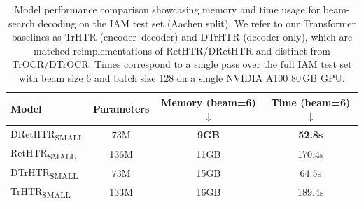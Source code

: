 \documentclass[times, review, 10pt]{elsarticle}
\begin{document}
\begin{table}[t]
\centering
\caption{Model performance comparison showcasing memory and time usage for beam-search decoding on the IAM test set (Aachen split). We refer to our Transformer baselines as TrHTR (encoder–decoder) and DTrHTR (decoder-only), which are matched reimplementations of RetHTR/DRetHTR and distinct from TrOCR/DTrOCR. Times correspond to a single pass over the full IAM test set with beam size 6 and batch size 128 on a single NVIDIA A100 80\,GB GPU. }
{\small
\begin{tabular*}{\linewidth}{@{\extracolsep{\fill}}lccc@{}}
\toprule
\textbf{Model} & \textbf{Parameters} & \textbf{Memory (beam=6)} $\downarrow$ & \textbf{Time (beam=6)} $\downarrow$ \\
\midrule
DRetHTR\textsubscript{SMALL} & \phantom{1}73M & \phantom{1}\textbf{9GB}  & \phantom{1}\textbf{52.8s} \\
RetHTR\textsubscript{SMALL}  & 136M           & 11GB                     & 170.4s \\
DTrHTR\textsubscript{SMALL}  & \phantom{1}73M & 15GB                     & \phantom{1}64.5s \\
TrHTR\textsubscript{SMALL}   & 133M           & 16GB                     & 189.4s \\
\bottomrule
\end{tabular*}
\label{tab:model_performance}
}
\end{table}
\end{document}
